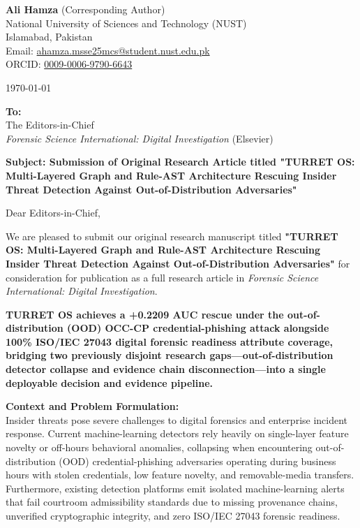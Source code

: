 \documentclass[11pt,a4paper]{article}
\begin{document}
\textbf{Ali Hamza} (Corresponding Author) \\
National University of Sciences and Technology (NUST) \\
Islamabad, Pakistan \\
Email: \href{mailto:ahamza.msse25mcs@student.nust.edu.pk}{ahamza.msse25mcs@student.nust.edu.pk} \\
ORCID: \href{https://orcid.org/0009-0006-9790-6643}{0009-0006-9790-6643}

\today

\textbf{To:} \\
The Editors-in-Chief \\
\textit{Forensic Science International: Digital Investigation} (Elsevier)

\textbf{Subject: Submission of Original Research Article titled "TURRET OS: Multi-Layered Graph and Rule-AST Architecture Rescuing Insider Threat Detection Against Out-of-Distribution Adversaries"}

Dear Editors-in-Chief,

We are pleased to submit our original research manuscript titled \textbf{"TURRET OS: Multi-Layered Graph and Rule-AST Architecture Rescuing Insider Threat Detection Against Out-of-Distribution Adversaries"} for consideration for publication as a full research article in \textit{Forensic Science International: Digital Investigation}.

\textbf{TURRET OS achieves a +0.2209 AUC rescue under the out-of-distribution (OOD) OCC-CP credential-phishing attack alongside 100\% ISO/IEC 27043 digital forensic readiness attribute coverage, bridging two previously disjoint research gaps---out-of-distribution detector collapse and evidence chain disconnection---into a single deployable decision and evidence pipeline.}

\textbf{Context and Problem Formulation:} \\
Insider threats pose severe challenges to digital forensics and enterprise incident response. Current machine-learning detectors rely heavily on single-layer feature novelty or off-hours behavioral anomalies, collapsing when encountering out-of-distribution (OOD) credential-phishing adversaries operating during business hours with stolen credentials, low feature novelty, and removable-media transfers. Furthermore, existing detection platforms emit isolated machine-learning alerts that fail courtroom admissibility standards due to missing provenance chains, unverified cryptographic integrity, and zero ISO/IEC 27043 forensic readiness.
\end{document}
